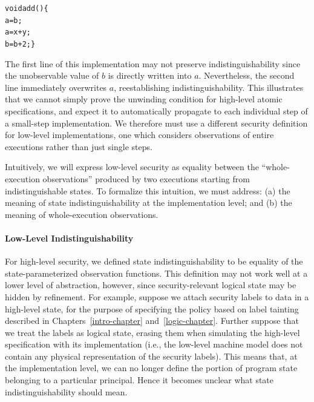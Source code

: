 {\small\begin{alltt}
  void add() \{
      a = b;
      a = x + y;
      b = b + 2;  \}
\end{alltt}}%

\noindent{}The first line of this implementation may not preserve 
indistinguishability since the unobservable value of $b$
is directly written into $a$. Nevertheless, the second line
immediately overwrites $a$, reestablishing indistinguishability.
This illustrates that we cannot
simply prove the unwinding condition for high-level atomic
specifications, and expect it to automatically propagate 
to each individual step of a small-step implementation. We therefore 
must use a different security definition for low-level implementations,
one which considers observations of entire executions rather
than just single steps.

Intuitively, we will express low-level security as equality between 
the ``whole-execution observations'' produced by two executions 
starting from indistinguishable states. To formalize this
intuition, we must address: (a) the meaning of state indistinguishability
at the implementation level; and (b) the meaning of whole-execution
observations.

\paragraph{Low-Level Indistinguishability}
For high-level security, we defined state indistinguishability
to be equality of the state-parameterized observation functions.
This definition may not work well at a lower level of 
abstraction, however, since security-relevant logical state may
be hidden by refinement. For example, suppose we attach security
labels to data in a high-level state, for the purpose of specifying
the policy based on label tainting described in Chapters~\ref{intro-chapter}
and~\ref{logic-chapter}. Further suppose
that we treat the labels as logical state, erasing them when
simulating the high-level specification with its implementation
(i.e., the low-level machine model does not contain any physical 
representation of the security labels).
This means that, at the implementation level, we can no longer define
the portion of program state belonging to a particular principal.
Hence it becomes unclear what state indistinguishability should
mean.

